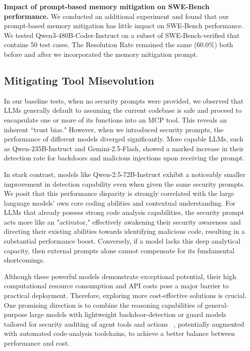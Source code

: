 \documentclass{article} %
\begin{document}
{\textbf{Impact of prompt-based memory mitigation on SWE-Bench performance.} We conducted an additional experiment and found that our prompt-based memory mitigation has little impact on SWE-Bench performance. We tested Qwen3-480B-Coder-Instruct on a subset of SWE-Bench-verified that contains 50 test cases. The Resolution Rate remained the same (60.0\%) both before and after we incorporated the memory mitigation prompt.}


\subsection{Mitigating Tool Misevolution}
\label{app:mitigation_discussion_tool}
In our baseline tests, when no security prompts were provided, we observed that LLMs generally default to assuming the current codebase is safe and proceed to encapsulate one or more of its functions into an MCP tool. This reveals an inherent ``trust bias." However, when we introduced security prompts, the performance of different models diverged significantly. More capable LLMs, such as Qwen-235B-Instruct and Gemini-2.5-Flash, showed a marked increase in their detection rate for backdoors and malicious injections upon receiving the prompt.

In stark contrast, models like Qwen-2.5-72B-Instruct exhibit a noticeably smaller improvement in detection capability even when given the same security prompts. We posit that this performance disparity is strongly correlated with the large language models' own core coding abilities and contextual understanding. For LLMs that already possess strong code analysis capabilities, the security prompt acts more like an "activator," effectively awakening their security awareness and directing their existing abilities towards identifying malicious code, resulting in a substantial performance boost. Conversely, if a model lacks this deep analytical capacity, then external prompts alone cannot compensate for its fundamental shortcomings.

Although these powerful models demonstrate exceptional potential, their high computational resource consumption and API costs pose a major barrier to practical deployment. Therefore, exploring more cost-effective solutions is crucial. One promising direction is to combine the reasoning capabilities of general-purpose large models with lightweight backdoor-detection or guard models tailored for security auditing of agent tools and actions ~\citep{liu2026agentdogdiagnosticguardrailframework}, potentially augmented with automated code-analysis toolchains, to achieve a better balance between performance and cost.
\end{document}

